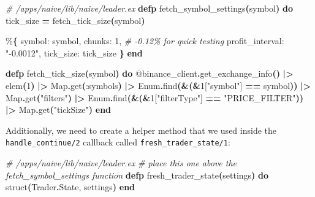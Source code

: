 \documentclass[
  oneside]{book}
\newenvironment{Shaded}{\begin{snugshade}}{\end{snugshade}}
\newcommand{\CommentTok}[1]{\textcolor[rgb]{0.56,0.35,0.01}{\textit{#1}}}
\newcommand{\ConstantTok}[1]{\textcolor[rgb]{0.56,0.35,0.01}{#1}}
\newcommand{\DecValTok}[1]{\textcolor[rgb]{0.00,0.00,0.81}{#1}}
\newcommand{\FunctionTok}[1]{\textcolor[rgb]{0.13,0.29,0.53}{\textbf{#1}}}
\newcommand{\KeywordTok}[1]{\textcolor[rgb]{0.13,0.29,0.53}{\textbf{#1}}}
\newcommand{\NormalTok}[1]{#1}
\newcommand{\OperatorTok}[1]{\textcolor[rgb]{0.81,0.36,0.00}{\textbf{#1}}}
\newcommand{\OtherTok}[1]{\textcolor[rgb]{0.56,0.35,0.01}{#1}}
\newcommand{\StringTok}[1]{\textcolor[rgb]{0.31,0.60,0.02}{#1}}
\newcommand{\VariableTok}[1]{\textcolor[rgb]{0.00,0.00,0.00}{#1}}
\begin{document}
\begin{Shaded}
\begin{Highlighting}[]
  \CommentTok{\# /apps/naive/lib/naive/leader.ex}
  \KeywordTok{defp}\NormalTok{ fetch\_symbol\_settings}\FunctionTok{(}\NormalTok{symbol}\FunctionTok{)} \KeywordTok{do}
\NormalTok{    tick\_size }\OperatorTok{=}\NormalTok{ fetch\_tick\_size}\FunctionTok{(}\NormalTok{symbol}\FunctionTok{)}

\NormalTok{    \%}\FunctionTok{\{}
      \VariableTok{symbol:}\NormalTok{ symbol,}
      \VariableTok{chunks:} \DecValTok{1}\NormalTok{,}
      \CommentTok{\# {-}0.12\% for quick testing}
      \VariableTok{profit\_interval:} \StringTok{"{-}0.0012"}\NormalTok{,}
      \VariableTok{tick\_size:}\NormalTok{ tick\_size}
    \FunctionTok{\}}
  \KeywordTok{end}

  \KeywordTok{defp}\NormalTok{ fetch\_tick\_size}\FunctionTok{(}\NormalTok{symbol}\FunctionTok{)} \KeywordTok{do}
    \OtherTok{@binance\_client}\OperatorTok{.}\NormalTok{get\_exchange\_info}\FunctionTok{()}
    \OperatorTok{|\textgreater{}}\NormalTok{ elem}\FunctionTok{(}\DecValTok{1}\FunctionTok{)}
    \OperatorTok{|\textgreater{}} \ConstantTok{Map}\OperatorTok{.}\NormalTok{get}\FunctionTok{(}\VariableTok{:symbols}\FunctionTok{)}
    \OperatorTok{|\textgreater{}} \ConstantTok{Enum}\OperatorTok{.}\NormalTok{find}\FunctionTok{(}\OperatorTok{\&}\FunctionTok{(}\OperatorTok{\&}\DecValTok{1}\OtherTok{[}\StringTok{"symbol"}\OtherTok{]} \OperatorTok{==}\NormalTok{ symbol}\FunctionTok{))}
    \OperatorTok{|\textgreater{}} \ConstantTok{Map}\OperatorTok{.}\NormalTok{get}\FunctionTok{(}\StringTok{"filters"}\FunctionTok{)}
    \OperatorTok{|\textgreater{}} \ConstantTok{Enum}\OperatorTok{.}\NormalTok{find}\FunctionTok{(}\OperatorTok{\&}\FunctionTok{(}\OperatorTok{\&}\DecValTok{1}\OtherTok{[}\StringTok{"filterType"}\OtherTok{]} \OperatorTok{==} \StringTok{"PRICE\_FILTER"}\FunctionTok{))}
    \OperatorTok{|\textgreater{}} \ConstantTok{Map}\OperatorTok{.}\NormalTok{get}\FunctionTok{(}\StringTok{"tickSize"}\FunctionTok{)}
  \KeywordTok{end}
\end{Highlighting}
\end{Shaded}

\newpage

Additionally, we need to create a helper method that we used inside the \texttt{handle\_continue/2} callback called \texttt{fresh\_trader\_state/1}:

\begin{Shaded}
\begin{Highlighting}[]
  \CommentTok{\# /apps/naive/lib/naive/leader.ex}
  \CommentTok{\# place this one above the \textasciigrave{}fetch\_symbol\_settings\textasciigrave{} function}
  \KeywordTok{defp}\NormalTok{ fresh\_trader\_state}\FunctionTok{(}\NormalTok{settings}\FunctionTok{)} \KeywordTok{do}
\NormalTok{    struct}\FunctionTok{(}\ConstantTok{Trader}\OperatorTok{.}\ConstantTok{State}\NormalTok{, settings}\FunctionTok{)}
  \KeywordTok{end}
\end{Highlighting}
\end{Shaded}
\end{document}

